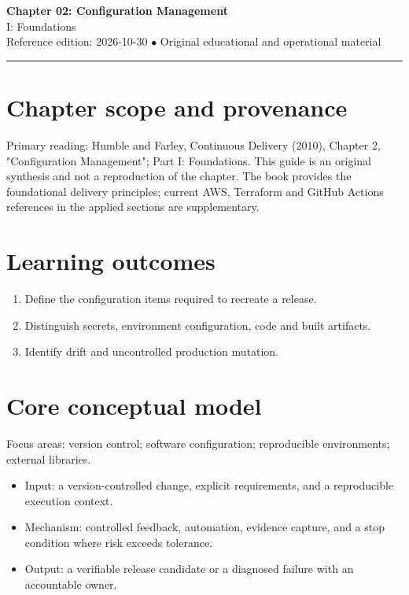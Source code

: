 \documentclass[10pt,letterpaper]{article}
\begin{document}
\begin{center}
{\LARGE\bfseries\color{cdblue}Chapter 02: Configuration Management}\\[7pt]
{\large I: Foundations}\\[6pt]
{\small Reference edition: 2026-10-30 $\bullet$ Original educational and operational material}
\end{center}
\noindent\color{cdblue}\rule{\linewidth}{1.2pt}\color{black}
\vspace{0.4em}
\section{Chapter scope and provenance}
Primary reading: Humble and Farley, Continuous Delivery (2010), Chapter 2, "Configuration Management"; Part I: Foundations. This guide is an original synthesis and not a reproduction of the chapter. The book provides the foundational delivery principles; current AWS, Terraform and GitHub Actions references in the applied sections are supplementary.


\section{Learning outcomes}
\begin{enumerate}
\item Define the configuration items required to recreate a release.
\item Distinguish secrets, environment configuration, code and built artifacts.
\item Identify drift and uncontrolled production mutation.
\end{enumerate}

\section{Core conceptual model}
Focus areas: version control; software configuration; reproducible environments; external libraries.

\begin{itemize}
\item Input: a version-controlled change, explicit requirements, and a reproducible execution context.
\item Mechanism: controlled feedback, automation, evidence capture, and a stop condition where risk exceeds tolerance.
\item Output: a verifiable release candidate or a diagnosed failure with an accountable owner.
\end{itemize}
\end{document}
